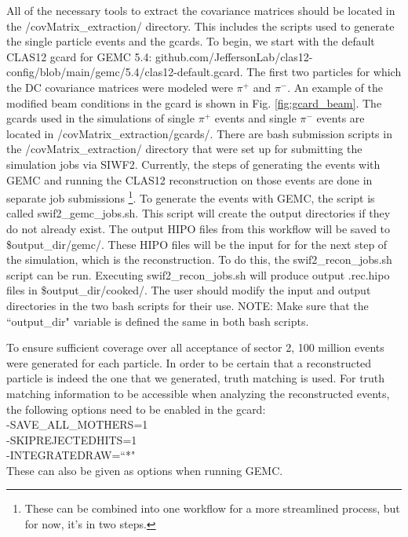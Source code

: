 \documentclass[showpacs,amsmath,amssymb,aps,prc,floatfix,showkeys,nofootinbib]{revtex4-1}
\begin{document}
All of the necessary tools to extract the covariance matrices should be located in the /covMatrix\_extraction/ directory. This includes the scripts used to generate the single particle events and the gcards. To begin, we start with the default CLAS12 gcard for GEMC 5.4: github.com/JeffersonLab/clas12-config/blob/main/gemc/5.4/clas12-default.gcard. The first two particles for which the DC covariance matrices were modeled were $\pi^+$ and $\pi^-$. An example of the modified beam conditions in the gcard is shown in Fig. \ref{fig:gcard_beam}. The gcards used in the simulations of single $\pi^+$ events and single $\pi^-$ events are located in /covMatrix\_extraction/gcards/. There are bash submission scripts in the /covMatrix\_extraction/ directory that were set up for submitting the simulation jobs via SIWF2. Currently, the steps of generating the events with GEMC and running the CLAS12 reconstruction on those events are done in separate job submissions \footnote{These can be combined into one workflow for a more streamlined process, but for now, it's in two steps.}. To generate the events with GEMC, the script is called swif2\_gemc\_jobs.sh. This script will create the output directories if they do not already exist. The output HIPO files from this workflow will be saved to \$output\_dir/gemc/. These HIPO files will be the input for for the next step of the simulation, which is the reconstruction. To do this, the swif2\_recon\_jobs.sh script can be run. Executing swif2\_recon\_jobs.sh will produce output .rec.hipo files in \$output\_dir/cooked/. The user should modify the input and output directories in the two bash scripts for their use. NOTE: Make sure that the ``output\_dir" variable is defined the same in both bash scripts.

To ensure sufficient coverage over all acceptance of sector 2, 100 million events were generated for each particle. In order to be certain that a reconstructed particle is indeed the one that we generated, truth matching is used. For truth matching information to be accessible when analyzing the reconstructed events, the following options need to be enabled in the gcard: \\
-SAVE\_ALL\_MOTHERS=1 \\
-SKIPREJECTEDHITS=1 \\
-INTEGRATEDRAW=``*"  \\
These can also be given as options when running GEMC.
\end{document}
